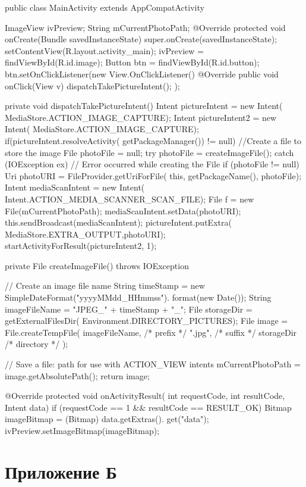 \documentclass[a4paper,12pt]{article}
\begin{document}
\begin{MyCode}
	
public class MainActivity extends AppCompatActivity {	
 ImageView ivPreview;
 String mCurrentPhotoPath;
 @Override
 protected void onCreate(Bundle savedInstanceState) {
	super.onCreate(savedInstanceState);
	setContentView(R.layout.activity_main);
	ivPreview = findViewById(R.id.image);
	Button btn = findViewById(R.id.button);
	btn.setOnClickListener(new View.OnClickListener() {
		@Override
		public void onClick(View v) {
			dispatchTakePictureIntent();
		}
	});
 }	

 private void dispatchTakePictureIntent() {
	Intent pictureIntent = new Intent(
	MediaStore.ACTION_IMAGE_CAPTURE);
	Intent pictureIntent2 = new Intent(
	MediaStore.ACTION_IMAGE_CAPTURE);
	if(pictureIntent.resolveActivity(
	getPackageManager()) != null){
		//Create a file to store the image
		File photoFile = null;
		try {
			photoFile = createImageFile();
		} catch (IOException ex) {
		// Error occurred while creating the File		
		}
		if (photoFile != null) {
			Uri photoURI = FileProvider.getUriForFile(
			this, getPackageName(), photoFile);
			Intent mediaScanIntent = new Intent(
			Intent.ACTION_MEDIA_SCANNER_SCAN_FILE);
			File f = new File(mCurrentPhotoPath);
			mediaScanIntent.setData(photoURI);
			this.sendBroadcast(mediaScanIntent);
			pictureIntent.putExtra(
			MediaStore.EXTRA_OUTPUT,photoURI);
			startActivityForResult(pictureIntent2,
			1);
		}
	}
 }

 private File createImageFile() throws IOException {
	// Create an image file name
	String timeStamp = new SimpleDateFormat("yyyyMMdd_HHmmss").
	format(new Date());
	String imageFileName = "JPEG_" + timeStamp + "_";
	File storageDir = getExternalFilesDir(
	Environment.DIRECTORY_PICTURES);
	File image = File.createTempFile(
	imageFileName,  /* prefix */
	".jpg",         /* suffix */
	storageDir      /* directory */
	);
	
	// Save a file: path for use with ACTION_VIEW intents
	mCurrentPhotoPath = image.getAbsolutePath();
	return image;
 }	

 @Override
 protected void onActivityResult(
 int requestCode, int resultCode, Intent data) {
	if (requestCode == 1 && resultCode == RESULT_OK) {
		Bitmap imageBitmap = (Bitmap) data.getExtras().
		get("data");
		ivPreview.setImageBitmap(imageBitmap);
	}
 }
}
\end{MyCode}

\pagebreak

\section*{ \centering Приложение Б} 
\end{document}
